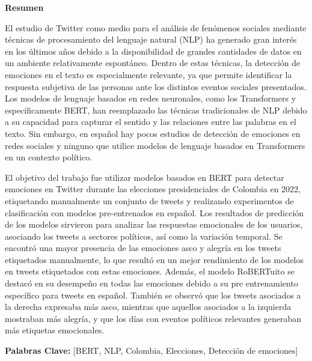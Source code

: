 \begin{center}
{\Large{\bf{Resumen}}}
\end{center}


El estudio de Twitter como medio para el análisis de fenómenos sociales mediante técnicas de procesamiento del lenguaje natural (NLP) ha generado gran interés en los últimos años debido a la disponibilidad de grandes cantidades de datos en un ambiente relativamente espontáneo. Dentro de estas técnicas, la detección de emociones en el texto es especialmente relevante, ya que permite identificar la respuesta subjetiva de las personas ante los distintos eventos sociales presentados. Los modelos de lenguaje basados en redes neuronales, como los Transformers y específicamente BERT, han reemplazado las técnicas tradicionales de NLP debido a su capacidad para capturar el sentido y las relaciones entre las palabras en el texto. Sin embargo, en español hay pocos estudios de detección de emociones en redes sociales y ninguno que utilice modelos de lenguaje basados en Transformers en un contexto político.


El objetivo del trabajo fue utilizar modelos basados en BERT para detectar emociones en Twitter durante las elecciones presidenciales de Colombia en 2022, etiquetando manualmente un conjunto de tweets y realizando experimentos de clasificación con modelos pre-entrenados en español. Los resultados de predicción de los modelos sirvieron para analizar las respuestas emocionales de los usuarios, asociando los tweets a sectores políticos, así como la variación temporal. Se encontró una mayor presencia de las emociones asco y alegría en los tweets etiquetados manualmente, lo que resultó en un mejor rendimiento de los modelos en tweets etiquetados con estas emociones. Además, el modelo RoBERTuito se destacó en su desempeño en todas las emociones debido a su pre entrenamiento específico para tweets en español. También se observó que los tweets asociados a la derecha expresaba más asco, mientras que aquellos asociados a la izquierda mostraban más alegría, y que los días con eventos políticos relevantes generaban más etiquetas emocionales.



\vspace{4cm} %
\textbf{Palabras Clave:} [BERT, NLP, Colombia, Elecciones, Detección de emociones]

\clearpage
